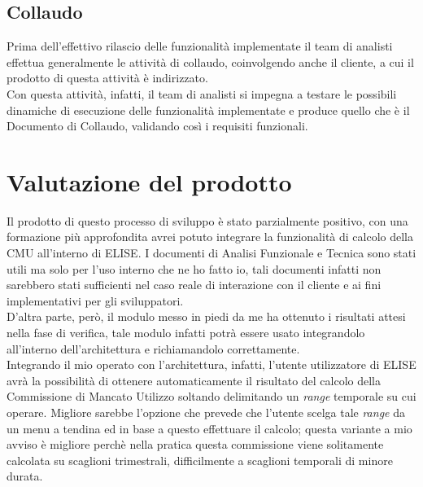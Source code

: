 \subsection{Collaudo}

	Prima dell'effettivo rilascio delle funzionalità implementate il team di analisti effettua generalmente le attività di collaudo, coinvolgendo anche il cliente, a cui il prodotto di questa attività è indirizzato.\\
	
	Con questa attività, infatti, il team di analisti si impegna a testare le possibili dinamiche di esecuzione delle funzionalità implementate e produce quello che è il Documento di Collaudo, validando così i requisiti funzionali.\\

\section{Valutazione del prodotto}

	Il prodotto di questo processo di sviluppo è stato parzialmente positivo, con una formazione più approfondita avrei potuto integrare la funzionalità di calcolo della CMU all'interno di ELISE. I documenti di Analisi Funzionale e Tecnica sono stati utili ma solo per l'uso interno che ne ho fatto io, tali documenti infatti non sarebbero stati sufficienti nel caso reale di interazione con il cliente e ai fini implementativi per gli sviluppatori.\\
	
	D'altra parte, però, il modulo messo in piedi da me ha ottenuto i risultati attesi nella fase di verifica, tale modulo infatti potrà essere usato integrandolo all'interno dell'architettura e richiamandolo correttamente.\\
	
	Integrando il mio operato con l'architettura, infatti, l'utente utilizzatore di ELISE avrà la possibilità di ottenere automaticamente il risultato del calcolo della Commissione di Mancato Utilizzo soltando delimitando un \textit{range} temporale su cui operare. Migliore sarebbe l'opzione che prevede che l'utente scelga tale \textit{range} da un menu a tendina ed in base a questo effettuare il calcolo; questa variante a mio avviso è migliore perchè nella pratica questa commissione viene solitamente calcolata su scaglioni trimestrali, difficilmente a scaglioni temporali di minore durata.\\
	
